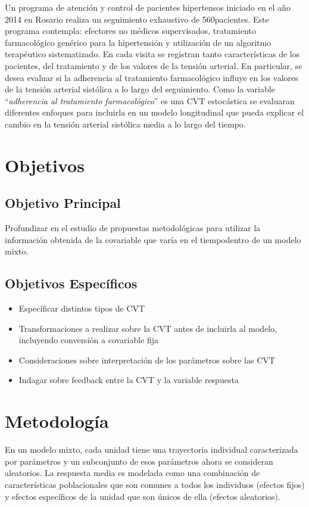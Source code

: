 \documentclass[12pt]{article}
\def\npatients{560}
\def\fullcovname{\emph{adherencia al tratamiento farmacológico}}
\def\cvt{covariable que varía en el tiempo}
\begin{document}
Un programa de atención y control de pacientes hipertensos iniciado en el año 2014 en Rosario realiza un seguimiento 
exhaustivo de \npatients pacientes. Este programa contempla: efectores no médicos supervisados, tratamiento farmacológico 
genérico para la hipertensión y utilización de un algoritmo terapéutico sistematizado. En cada visita se registran tanto 
características de los pacientes, del tratamiento y de los valores de la tensión arterial. En particular, se desea evaluar 
si la adherencia al tratamiento farmacológico influye en los valores de la tensión arterial sistólica a lo largo del 
seguimiento. Como la variable “\fullcovname” es una CVT estocástica se evaluaran diferentes enfoques para incluirla en un 
modelo longitudinal que pueda explicar el cambio en la tensión arterial sistólica media a lo largo del tiempo. 

\newpage
\section{Objetivos}

\subsection{Objetivo Principal}

Profundizar en el estudio de propuestas metodológicas para utilizar la información obtenida de la \cvt dentro de un 
modelo mixto.

\subsection{Objetivos Específicos}

\begin{itemize}
	\item Específicar distintos tipos de CVT
	\item Transformaciones a realizar sobre la CVT antes de incluirla al modelo, incluyendo conversión a covariable fija
	\item Consideraciones sobre interpretación de los parámetros sobre las CVT
	\item Indagar sobre feedback entre la CVT y la variable respuesta
\end{itemize}

\newpage
\section{Metodología}

En un modelo mixto, cada unidad tiene una trayectoria individual caracterizada por parámetros y un subconjunto de esos 
parámetros ahora se consideran aleatorios. La respuesta media es modelada como una combinación de características 
poblacionales que son comunes a todos los individuos (efectos fijos) y efectos específicos de la unidad que son únicos de 
ella (efectos aleatorios).
\end{document}
